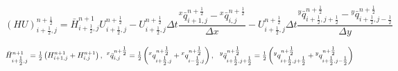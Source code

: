 \documentclass{article}
\begin{document}
\noindent 
\begin{equation} \label{ZEqnNum191993} 
\left(HU\right)_{i+{\tfrac{1}{2}} ,j}^{n+{\tfrac{1}{2}} } =\bar{H}_{i+{\tfrac{1}{2}} ,j}^{n+1} U_{i+{\tfrac{1}{2}} ,j}^{n+{\tfrac{1}{2}} } -U_{i+{\tfrac{1}{2}} ,j}^{n+{\tfrac{1}{2}} } \Delta t\frac{{}^{x} \bar{q}_{i+1,j}^{n+{\tfrac{1}{2}} } -{}^{x} \bar{q}_{i,j}^{n+{\tfrac{1}{2}} } }{\Delta x} -U_{i+{\tfrac{1}{2}} ,j}^{n+{\tfrac{1}{2}} } \Delta t\frac{{}^{y} \bar{q}_{i+{\tfrac{1}{2}} ,j+{\tfrac{1}{2}} }^{n+{\tfrac{1}{2}} } -{}^{y} \bar{q}_{i+{\tfrac{1}{2}} ,j-{\tfrac{1}{2}} }^{n+{\tfrac{1}{2}} } }{\Delta y}  
\end{equation} 

\[\bar{H}_{i+{\tfrac{1}{2}} ,j}^{n+1} ={\tfrac{1}{2}} \left(H_{i+1,j}^{n+1} +H_{i,j}^{n+1} \right){\rm ,\; \; }{}^{x} \bar{q}_{i,j}^{n+{\tfrac{1}{2}} } ={\tfrac{1}{2}} \left({}^{x} q_{i+{\tfrac{1}{2}} ,j}^{n+{\tfrac{1}{2}} } +{}^{x} q_{i-{\tfrac{1}{2}} ,j}^{n+{\tfrac{1}{2}} } \right){\rm ,\; \; \; }{}^{y} \bar{q}_{i+{\tfrac{1}{2}} ,j+{\tfrac{1}{2}} }^{n+{\tfrac{1}{2}} } ={\tfrac{1}{2}} \left({}^{y} q_{i+{\tfrac{1}{2}} ,j+{\tfrac{1}{2}} }^{n+{\tfrac{1}{2}} } +{}^{y} q_{i+{\tfrac{1}{2}} ,j-{\tfrac{1}{2}} }^{n+{\tfrac{1}{2}} } \right)\] 
\end{document}
